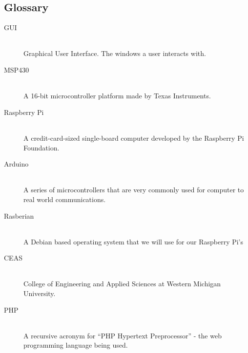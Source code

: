 \documentclass{report}
\begin{document}
\subsection*{Glossary}
\begin{description}
\item [GUI] \hfill \\
Graphical User Interface. The windows a user interacts with.
\item [MSP430] \hfill \\
A 16-bit microcontroller platform made by Texas Instruments.
\item [Raspberry Pi] \hfill \\
 A credit-card-sized single-board computer developed by the Raspberry Pi Foundation.
\item [Arduino] \hfill \\
A series of microcontrollers that are very commonly used for computer to real world communications.
\item [Rasberian] \hfill \\
 A Debian based operating system that we will use for our Raspberry Pi’s
\item [CEAS] \hfill \\
College of Engineering and Applied Sciences at Western Michigan University.
\item [PHP] \hfill \\
A recursive acronym for “PHP Hypertext Preprocessor” - the web programming language being used.
\end{description}
\newpage
\end{document}
